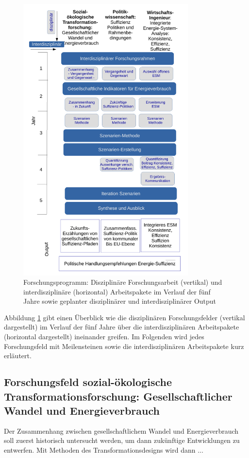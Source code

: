 \documentclass[a4paper,11pt,twoside]{scrartcl}
\begin{document}
\begin{figure}[!h]
    \centering
    \includegraphics[width=0.8\textwidth]{figures/Forschungsarbeit.pdf}
    \caption{Forschungsprogramm: Disziplinäre Forschungsarbeit (vertikal) und  interdisziplinäre (horizontal) Arbeitspakete im Verlauf der fünf Jahre sowie geplanter disziplinärer und interdisziplinärer Output}
    \label{fig:forschungsprogramm}
\end{figure}

Abbildung \ref{fig:forschungsprogramm} gibt einen Überblick wie die disziplinären Forschungsfelder (vertikal dargestellt) im Verlauf der fünf Jahre über die interdisziplinären Arbeitspakete (horizontal dargestellt) ineinander greifen. Im Folgenden wird jedes Forschungsfeld mit Meilensteinen sowie die interdisziplinären Arbeitspakete kurz erläutert.

\subsection*{Forschungsfeld sozial-ökologische Transformationsforschung: Gesellschaftlicher Wandel und Energieverbrauch}
Der Zusammenhang zwischen gesellschaftlichem Wandel und Energieverbrauch soll zuerst historisch untersucht werden, um dann zukünftige Entwicklungen zu entwerfen. Mit Methoden des Transformationsdesigns wird dann ...
\end{document}
